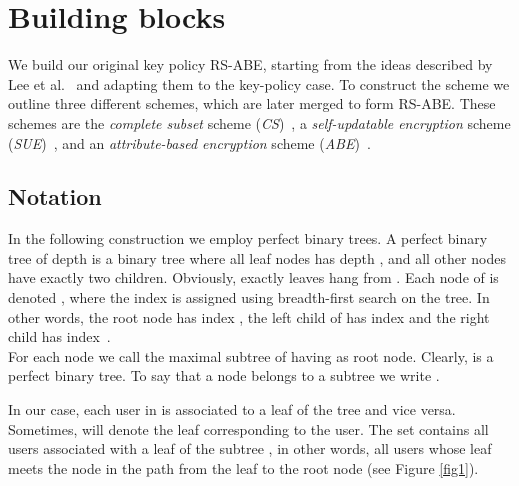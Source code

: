 \documentclass[a4paper,10pt]{article}
\begin{document}
	





	\section{Building blocks}\label{sec:block}
	
	We build our original key policy RS-ABE, starting from the ideas described by Lee et al.~\cite{lee2013RSABE} and adapting them to the key-policy case. To construct the scheme we outline three different schemes, which are later merged to form RS-ABE. These schemes are the \emph{complete subset} scheme (\emph{CS})~\cite{naor2001SC}, a \emph{self-updatable encryption} scheme (\emph{SUE})~\cite{lee2013RSABE}, and an \emph{attribute-based encryption} scheme (\emph{ABE})~\cite{lewko2010ABE}.


	\subsection{Notation}
	In the following construction we employ perfect binary trees. 
A perfect binary tree  of depth  is a binary tree where all leaf nodes has depth , and all other nodes have exactly two children. Obviously,  exactly  leaves hang from . Each node of  is denoted  , where the index  is assigned using breadth-first search on the tree. In other words, the root node has index , the left child of  has index  and the right child has index~.\\ 
	For each node  we call  the maximal subtree of  having  as root node. Clearly,  is a perfect binary tree. To say that a node  belongs to a subtree  we write .
	
	In our case, each user in   is associated to a leaf of the tree and vice versa. Sometimes,   will denote the leaf corresponding to the user. The set  contains all users associated with a leaf of the subtree , in other words, all users whose leaf meets the node  in the path from the leaf to the root node (see Figure \ref{fig1}).
\end{document}
